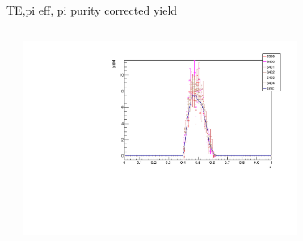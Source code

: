 \begin{frame}{TE,pi eff, pi purity corrected yield}
\begin{columns}
\begin{column}[T]{0.5\textwidth}
\end{column}
\begin{column}[T]{0.5\textwidth}
\includegraphics[width = 0.7\textwidth]{results/yield/check/yieldcheck_250_pos.pdf}
\end{column}
\end{columns}
\end{frame}
